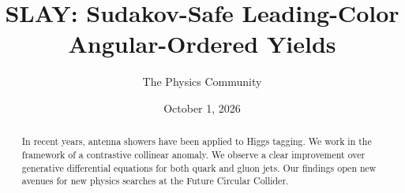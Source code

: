 \documentclass[11pt]{article}
\title{SLAY: Sudakov-Safe Leading-Color Angular-Ordered Yields}
\author{The Physics Community}
\date{October 1, 2026}
\numberwithin{equation}{section}
\theoremstyle{definition}
\theoremstyle{remark}
\begin{document}
\maketitle
\begin{abstract}
In recent years, antenna showers have been applied to Higgs tagging. We
work in the framework of a contrastive collinear anomaly. We observe a
clear improvement over generative differential equations for both quark
and gluon jets. Our findings open new avenues for new physics searches
at the Future Circular Collider.
\end{abstract}
\tableofcontents




\nocite{*}


\end{document}
